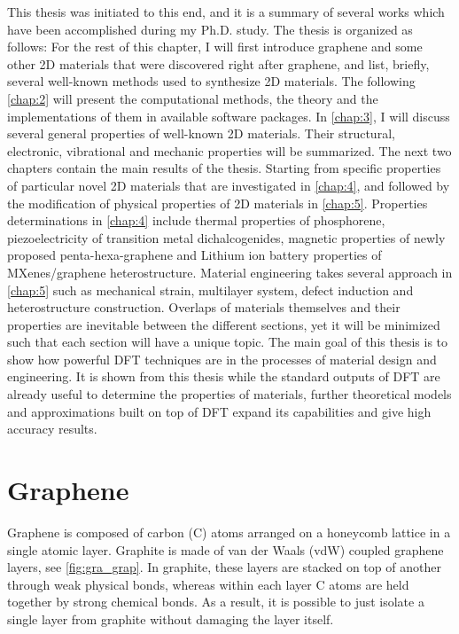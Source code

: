 This thesis was initiated to this end, and it is a summary of several works which have been accomplished during my Ph.D. study. The thesis is organized as follows: For the rest of this chapter, I will first introduce graphene and some other 2D materials that were discovered right after graphene, and list, briefly, several well-known methods used to synthesize 2D materials. The following \autoref{chap:2} will present the computational methods, the theory and the implementations of them in available software packages. In \autoref{chap:3}, I will discuss several general properties of well-known 2D materials. Their structural, electronic, vibrational and mechanic properties will be summarized. The next two chapters contain the main results of the thesis. Starting from specific properties of particular novel 2D materials that are investigated in \autoref{chap:4}, and followed by the modification of physical properties of 2D materials in \autoref{chap:5}. Properties determinations in \autoref{chap:4} include thermal properties of phosphorene, piezoelectricity of transition metal dichalcogenides, magnetic properties of newly proposed penta-hexa-graphene and Lithium ion battery properties of MXenes/graphene heterostructure. Material engineering takes several approach in \autoref{chap:5} such as mechanical strain, multilayer system, defect induction and heterostructure construction. Overlaps of materials themselves and their properties are inevitable between the different sections, yet it will be minimized such that each section will have a unique topic.  The main goal of this thesis is to show how powerful DFT techniques are in the processes of material design and engineering. It is shown from this thesis while the standard outputs of DFT are already useful to determine the properties of materials, further theoretical models and approximations built on top of DFT expand its capabilities and give high accuracy results.

\section{Graphene}

Graphene is composed of carbon (C) atoms arranged on a honeycomb lattice in a single atomic layer. Graphite is made of van der Waals (vdW) coupled graphene layers, see \autoref{fig:gra_grap}. In graphite, these layers are stacked on top of another through weak physical bonds, whereas within each layer C atoms are held together by strong chemical bonds. As a result, it is possible to just isolate a single layer from graphite without damaging the layer itself. 

